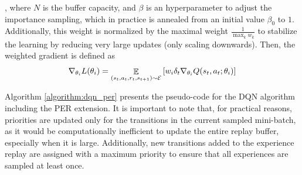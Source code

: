 , where $N$ is the buffer capacity, and $\beta$ is an hyperparameter to adjust the importance sampling, which in practice is annealed from an initial value $\beta_0$ to $1$. Additionally, this weight is normalized by the maximal weight $\frac{1}{\max_k w_k}$ to stabilize the learning by reducing very large updates (only scaling downwards). Then, the weighted gradient is defined as
\begin{equation}
    \nabla_{\theta_i} L(\theta_i) = \mathop{\mathbb{E}}\limits_{(s_t, a_t, r_t, s_{t+1}) \sim \mathcal{E}}\left[ w_i \delta_t \nabla_{\theta_i}Q(s_t, a_t; \theta_i)\right] 
\end{equation}

Algorithm \ref{algorithm:dqn_per} presents the pseudo-code for the DQN algorithm including the PER extension. It is important to note that, for practical reasons, priorities are updated only for the transitions in the current sampled mini-batch, as it would be computationally inefficient to update the entire replay buffer, especially when it is large. Additionally, new transitions added to the experience replay are assigned with a maximum priority to ensure that all experiences are sampled at least once.


